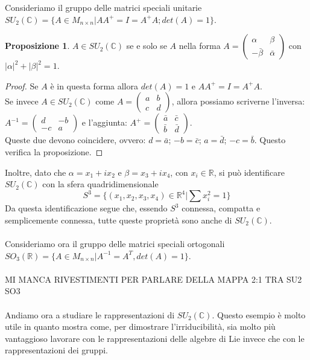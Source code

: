 \documentclass[12pt,a4paper]{report}
\theoremstyle{definition}
\newtheorem{Prop}[Def]{Proposizione}
\theoremstyle{definition}
\theoremstyle{definition}
\theoremstyle{remark}
\begin{document}
Consideriamo il gruppo delle matrici speciali unitarie $SU_2(\mathbb{C})=\{A\in M_{n\times n}|AA^{+}=I=A^{+}A;det(A)=1\}$.
\begin{Prop}
	$A\in SU_2(\mathbb{C})$ se e solo se $A$ nella forma $A=
	\begin{pmatrix}
		\alpha & \beta \\
		-\bar{\beta} & \bar{\alpha}
	\end{pmatrix}
	$ con $|\alpha|^2+|\beta|^2=1$.
\end{Prop}
\begin{proof}
	Se $A$ è in questa forma allora $det(A)=1$ e $AA^{+}=I=A^{+}A$.\\
	Se invece $A\in SU_2(\mathbb{C})$ come $A=
	\begin{pmatrix}
		a & b \\
		c & d
	\end{pmatrix}$, allora possiamo scriverne l'inversa:
$A^{-1}=\begin{pmatrix}
	d & -b \\
	-c & a
\end{pmatrix}$ e l'aggiunta: $A^+=
\begin{pmatrix}
	\bar{a} & \bar{c} \\
	\bar{b} & \bar{d}
\end{pmatrix}$.\\
Queste due devono coincidere, ovvero: $d=\bar{a}$; $-b=\bar{c}$; $a=\bar{d}$; $-c=\bar{b}$. Questo verifica la proposizione.
\end{proof}
Inoltre, dato che $\alpha=x_1+ix_2$ e $\beta=x_3+ix_4$, con $x_i\in\mathbb{R}$, si può identificare $SU_2(\mathbb{C})$ con la sfera quadridimensionale $$S^3=\{(x_1,x_2,x_3,x_4)\in \mathbb{R}^4|\sum x_i^2=1\}$$
Da questa identificazione segue che, essendo $S^3$ connessa, compatta e semplicemente connessa, tutte queste proprietà sono anche di $SU_2(\mathbb{C})$.\\
\\
Consideriamo ora il gruppo delle matrici speciali ortogonali $SO_3(\mathbb{R})=\{A\in M_{n\times n}|A^{-1}=A^T, det(A)=1\}$.
\\
\\
MI MANCA RIVESTIMENTI PER PARLARE DELLA MAPPA 2:1 TRA SU2 SO3
\\
\\
Andiamo ora a studiare le rappresentazioni di $SU_2(\mathbb{C})$. Questo esempio è molto utile in quanto mostra come, per dimostrare l'irriducibilità, sia molto più vantaggioso lavorare con le rappresentazioni delle algebre di Lie invece che con le rappresentazioni dei gruppi.\\
\end{document}
